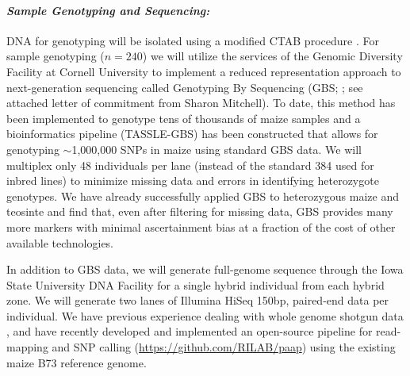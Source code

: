 \paragraph{\emph{Sample Genotyping and Sequencing:}}
DNA for genotyping will be isolated using a modified CTAB procedure \citep{Saghai-Maroof1984}.  For sample genotyping ($n=240$) we will utilize the services of the Genomic Diversity Facility at Cornell University to implement a reduced representation approach to next-generation sequencing called Genotyping By Sequencing (GBS; \citealt{Elshire2011}; see attached letter of commitment from Sharon Mitchell). To date, this method has been implemented to genotype tens of thousands of maize samples and a bioinformatics pipeline (TASSLE-GBS) has been constructed that allows for genotyping $\sim$1,000,000 SNPs in maize \citep{Glaubitz2014} using standard GBS data. 
We will multiplex only 48 individuals per lane (instead of the standard 384 used for inbred lines) to minimize missing data and errors in identifying heterozygote genotypes.
We have already successfully applied GBS to heterozygous maize and teosinte and find that, even after filtering for missing data, GBS provides many more markers with minimal ascertainment bias at a fraction of the cost of other available technologies. 

In addition to GBS data, we will generate full-genome sequence through the Iowa State University DNA Facility for a single hybrid individual from each hybrid zone.  We will generate two lanes of Illumina HiSeq 150bp, paired-end data per individual.  
We have previous experience dealing with whole genome shotgun data \citep{Gore2009,Chia2012a,Hufford2012b}, and have recently developed and implemented an open-source pipeline for read-mapping and SNP calling (\url{https://github.com/RILAB/paap}) using the existing maize B73 reference genome.

